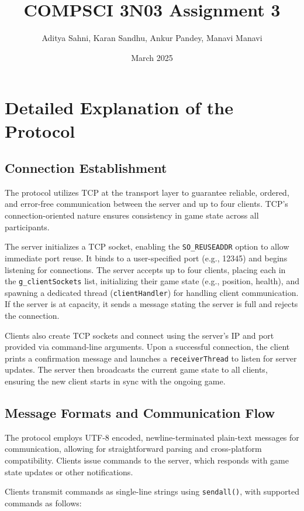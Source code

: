 \documentclass{article}
\title{COMPSCI 3N03 Assignment 3}
\author{Aditya Sahni, Karan Sandhu, Ankur Pandey, Manavi Manavi }
\date{March 2025}
\begin{document}
\maketitle

\section{Detailed Explanation of the Protocol}

\subsection{Connection Establishment}

The protocol utilizes TCP at the transport layer to guarantee reliable, ordered, and error-free communication between the server and up to four clients. TCP's connection-oriented nature ensures consistency in game state across all participants.

The server initializes a TCP socket, enabling the \texttt{SO\_REUSEADDR} option to allow immediate port reuse. It binds to a user-specified port (e.g., 12345) and begins listening for connections. The server accepts up to four clients, placing each in the \texttt{g\_clientSockets} list, initializing their game state (e.g., position, health), and spawning a dedicated thread (\texttt{clientHandler}) for handling client communication. If the server is at capacity, it sends a message stating the server is full and rejects the connection.

Clients also create TCP sockets and connect using the server's IP and port provided via command-line arguments. Upon a successful connection, the client prints a confirmation message and launches a \texttt{receiverThread} to listen for server updates. The server then broadcasts the current game state to all clients, ensuring the new client starts in sync with the ongoing game.

\subsection{Message Formats and Communication Flow}

The protocol employs UTF-8 encoded, newline-terminated plain-text messages for communication, allowing for straightforward parsing and cross-platform compatibility. Clients issue commands to the server, which responds with game state updates or other notifications.

Clients transmit commands as single-line strings using \texttt{sendall()}, with supported commands as follows:
\end{document}
